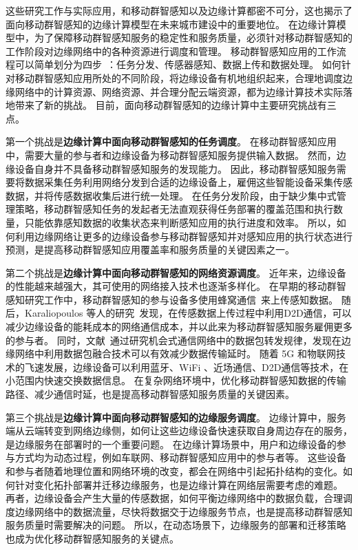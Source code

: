 这些研究工作与实际应用，和移动群智感知以及边缘计算都密不可分，这也揭示了面向移动群智感知的边缘计算模型在未来城市建设中的重要地位。
在边缘计算模型中，为了保障移动群智感知服务的稳定性和服务质量，必须针对移动群智感知的工作阶段对边缘网络中的各种资源进行调度和管理。
移动群智感知应用的工作流程可以简单划分为四步~\cite{zh_cn:shi}：任务分发、传感器感知、数据上传和数据处理。
如何针对移动群智感知应用所处的不同阶段，将边缘设备有机地组织起来，合理地调度边缘网络中的计算资源、网络资源、并合理分配云端资源，都为边缘计算技术实际落地带来了新的挑战。
目前，面向移动群智感知的边缘计算中主要研究挑战有三点。

第一个挑战是\textbf{边缘计算中面向移动群智感知的任务调度}。
在移动群智感知应用中，需要大量的参与者和边缘设备为移动群智感知服务提供输入数据。
然而，边缘设备自身并不具备移动群智感知服务的发现能力。
因此，移动群智感知服务需要将数据采集任务利用网络分发到合适的边缘设备上，雇佣这些智能设备采集传感数据，并将传感数据收集后进行统一处理。
在任务分发阶段，由于缺少集中式管理策略，移动群智感知任务的发起者无法直观获得任务部署的覆盖范围和执行数量，只能依靠感知数据的收集状态来判断感知应用的执行进度和效率。
所以，如何利用边缘网络让更多的边缘设备参与移动群智感知并对感知应用的执行状态进行预测，是提高移动群智感知应用覆盖率和服务质量的关键因素之一。

第二个挑战是\textbf{边缘计算中面向移动群智感知的网络资源调度}。
近年来，边缘设备的性能越来越强大，其可使用的网络接入技术也逐渐多样化。
在早期的移动群智感知研究工作中，移动群智感知的参与设备多使用蜂窝通信~\cite{DBLP:conf/globecom/ZhangJLLC16,DBLP:conf/icdcs/XiaoWHHH16}来上传感知数据。
随后，Karaliopoulos 等人的研究~\cite{DBLP:conf/infocom/KaraliopoulosTK15}发现，在传感数据上传过程中利用D2D通信，可以减少边缘设备的能耗成本的网络通信成本，并以此来为移动群智感知服务雇佣更多的参与者。
同时，文献~\cite{DBLP:journals/tpds/ZhaoMTL15}通过研究机会式通信网络中的数据包转发规律，发现在边缘网络中利用数据包融合技术可以有效减少数据传输延时。
随着 5G 和物联网技术的飞速发展，边缘设备可以利用蓝牙、WiFi 、近场通信、D2D通信等技术，在小范围内快速交换数据信息。
在复杂网络环境中，优化移动群智感知数据的传输路径、减少通信时延，也是提高移动群智感知服务质量的关键因素。

第三个挑战是\textbf{边缘计算中面向移动群智感知的边缘服务调度}。
边缘计算中，服务端从云端转变到网络边缘侧，如何让这些边缘设备快速获取自身周边存在的服务，是边缘服务在部署时的一个重要问题。
在边缘计算场景中，用户和边缘设备的参与方式均为动态过程，例如车联网、移动群智感知应用中的参与者等。
这些设备和参与者随着地理位置和网络环境的改变，都会在网络中引起拓扑结构的变化。如何针对变化拓扑部署并迁移边缘服务，也是边缘计算在网络层需要考虑的难题。
再者，边缘设备会产生大量的传感数据，如何平衡边缘网络中的数据负载，合理调度边缘网络中的数据流量，尽快将数据交于边缘服务节点，也是提高移动群智感知服务质量时需要解决的问题。
所以，在动态场景下，边缘服务的部署和迁移策略也成为优化移动群智感知服务的关键点。



